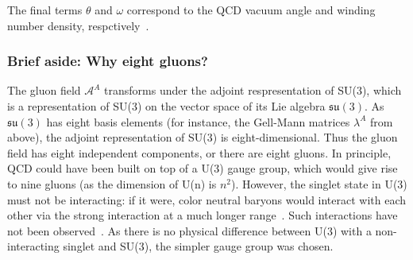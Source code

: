 The final terms $\theta$ and $\omega$ correspond to the QCD vacuum angle and winding number density, respctively~\cite{VacuumAngle, WindingNumber}.




\subsubsection{Brief aside: Why eight gluons?}
\label{sec:why_eight_gluons}

The gluon field $\mathcal{A}^A$ transforms under the adjoint respresentation of SU(3), which is a representation of SU(3) on the vector space of its Lie algebra $\mathfrak{su}(3)$. As $\mathfrak{su}(3)$ has eight basis elements (for instance, the Gell-Mann matrices $\lambda^A$ from above), the adjoint representation of SU(3) is eight-dimensional. Thus the gluon field has eight independent components, or there are eight gluons. In principle, QCD could have been built on top of a U(3) gauge group, which would give rise to nine gluons (as the dimension of U(n) is $n^2$). However, the singlet state in U(3) must not be interacting: if it were, color neutral baryons would interact with each other via the strong interaction at a much longer range~\cite{SingletGluons}. Such interactions have not been observed~\cite{SingletGluons2}. As there is no physical difference between U(3) with a non-interacting singlet and SU(3), the simpler gauge group was chosen. 

